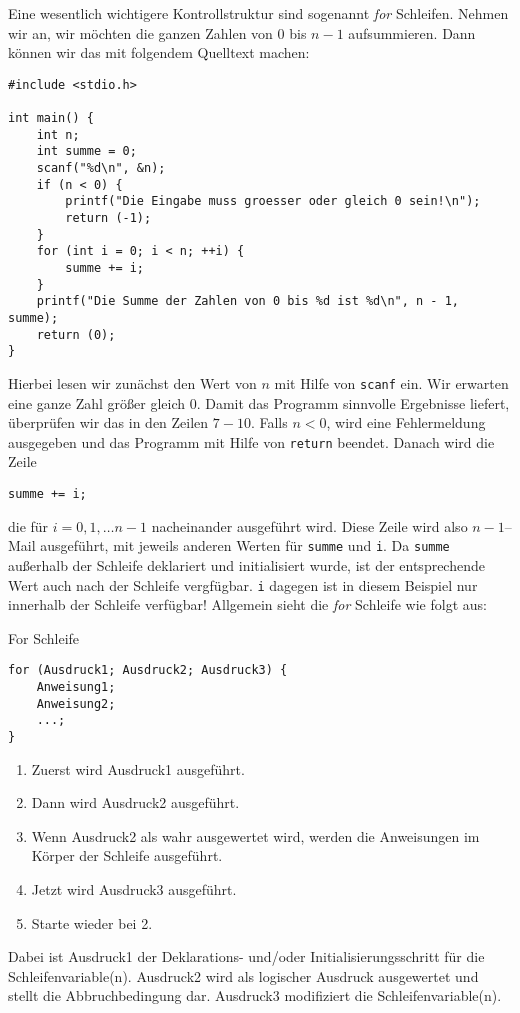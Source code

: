 Eine wesentlich wichtigere Kontrollstruktur sind sogenannt \emph{for} Schleifen.
Nehmen wir an, wir möchten die ganzen Zahlen von $0$ bis $n-1$ aufsummieren.
Dann können wir das mit folgendem Quelltext machen:
\begin{lstlisting}
#include <stdio.h>

int main() {
    int n;
    int summe = 0;
    scanf("%d\n", &n);
    if (n < 0) {
        printf("Die Eingabe muss groesser oder gleich 0 sein!\n");
        return (-1);
    }
    for (int i = 0; i < n; ++i) {
        summe += i;
    }
    printf("Die Summe der Zahlen von 0 bis %d ist %d\n", n - 1, summe);
    return (0);
}
\end{lstlisting}
Hierbei lesen wir zunächst den Wert von $n$ mit Hilfe von \verb|scanf| ein.
Wir erwarten eine ganze Zahl größer gleich $0$.
Damit das Programm sinnvolle Ergebnisse liefert, überprüfen wir das in den Zeilen $7-10$.
Falls $n<0$, wird eine Fehlermeldung ausgegeben und das Programm mit Hilfe von \verb|return| beendet.
Danach wird die Zeile 
\begin{lstlisting}
summe += i;
\end{lstlisting}
die für $i=0,1,\ldots n-1$ nacheinander ausgeführt wird.
Diese Zeile wird also $n-1$--Mail ausgeführt, mit jeweils anderen Werten für \verb|summe| und \verb|i|.
Da \verb|summe| außerhalb der Schleife deklariert und initialisiert wurde, ist der entsprechende Wert auch nach der Schleife vergfügbar.
\verb|i| dagegen ist in diesem Beispiel nur innerhalb der Schleife verfügbar!
Allgemein sieht die \emph{for} Schleife wie folgt aus:
\begin{myalertblock}{For Schleife}
\begin{lstlisting}
for (Ausdruck1; Ausdruck2; Ausdruck3) {
    Anweisung1;
    Anweisung2;
    ...;
}
\end{lstlisting}
\vspace{-1cm}
\begin{enumerate}
\item Zuerst wird Ausdruck1 ausgeführt.
\item Dann wird Ausdruck2 ausgeführt.
\item Wenn Ausdruck2 als wahr ausgewertet wird, werden die Anweisungen im Körper der Schleife ausgeführt.
\item Jetzt wird Ausdruck3 ausgeführt.
\item Starte wieder bei 2.
\end{enumerate}
\end{myalertblock}
Dabei ist Ausdruck1 der Deklarations- und/oder Initialisierungsschritt für die Schleifenvariable(n).
Ausdruck2 wird als logischer Ausdruck ausgewertet und stellt die Abbruchbedingung dar.
Ausdruck3 modifiziert die Schleifenvariable(n).

